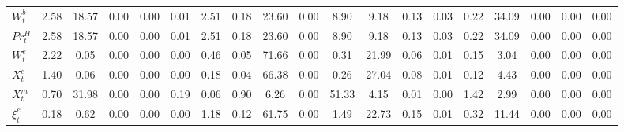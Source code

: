 \begin{center}
\begin{longtable}{lcccccccccccccccccc}
$ W^b_t             $	 & 	             2.58	 & 	            18.57	 & 	             0.00	 & 	             0.00	 & 	             0.01	 & 	             2.51	 & 	             0.18	 & 	            23.60	 & 	             0.00	 & 	             8.90	 & 	             9.18	 & 	             0.13	 & 	             0.03	 & 	             0.22	 & 	            34.09	 & 	             0.00	 & 	             0.00	 & 	             0.00 \\ 
$ Pr^H_t            $	 & 	             2.58	 & 	            18.57	 & 	             0.00	 & 	             0.00	 & 	             0.01	 & 	             2.51	 & 	             0.18	 & 	            23.60	 & 	             0.00	 & 	             8.90	 & 	             9.18	 & 	             0.13	 & 	             0.03	 & 	             0.22	 & 	            34.09	 & 	             0.00	 & 	             0.00	 & 	             0.00 \\ 
$ W^e_t             $	 & 	             2.22	 & 	             0.05	 & 	             0.00	 & 	             0.00	 & 	             0.00	 & 	             0.46	 & 	             0.05	 & 	            71.66	 & 	             0.00	 & 	             0.31	 & 	            21.99	 & 	             0.06	 & 	             0.01	 & 	             0.15	 & 	             3.04	 & 	             0.00	 & 	             0.00	 & 	             0.00 \\ 
$ X^e_t             $	 & 	             1.40	 & 	             0.06	 & 	             0.00	 & 	             0.00	 & 	             0.00	 & 	             0.18	 & 	             0.04	 & 	            66.38	 & 	             0.00	 & 	             0.26	 & 	            27.04	 & 	             0.08	 & 	             0.01	 & 	             0.12	 & 	             4.43	 & 	             0.00	 & 	             0.00	 & 	             0.00 \\ 
$ X^m_t             $	 & 	             0.70	 & 	            31.98	 & 	             0.00	 & 	             0.00	 & 	             0.19	 & 	             0.06	 & 	             0.90	 & 	             6.26	 & 	             0.00	 & 	            51.33	 & 	             4.15	 & 	             0.01	 & 	             0.00	 & 	             1.42	 & 	             2.99	 & 	             0.00	 & 	             0.00	 & 	             0.00 \\ 
$ \xi^e_t           $	 & 	             0.18	 & 	             0.62	 & 	             0.00	 & 	             0.00	 & 	             0.00	 & 	             1.18	 & 	             0.12	 & 	            61.75	 & 	             0.00	 & 	             1.49	 & 	            22.73	 & 	             0.15	 & 	             0.01	 & 	             0.32	 & 	            11.44	 & 	             0.00	 & 	             0.00	 & 	             0.00 \\ 

\end{longtable}
\end{center}
